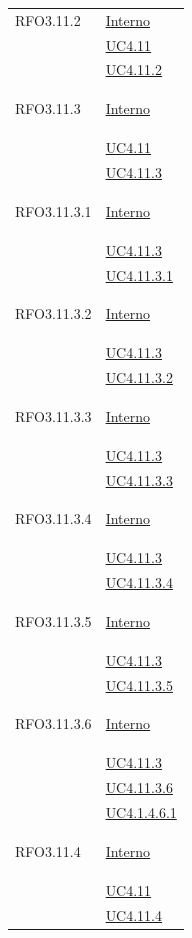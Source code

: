 \begin{longtable}{|>{\centering}m{5cm}|m{5cm}<{\centering}|}
\hypertarget{RFO3.11.2}{RFO3.11.2} & \hyperlink{Interno}{Interno}\\
& \hyperref[UC4.11]{UC4.11}\\
& \hyperref[UC4.11.2]{UC4.11.2}\\ \hline

\hypertarget{RFO3.11.3}{RFO3.11.3} & \hyperlink{Interno}{Interno}\\
& \hyperref[UC4.11]{UC4.11}\\
& \hyperref[UC4.11.3]{UC4.11.3}\\ \hline

\hypertarget{RFO3.11.3.1}{RFO3.11.3.1} & \hyperlink{Interno}{Interno}\\
& \hyperref[UC4.11.3]{UC4.11.3}\\
& \hyperref[UC4.11.3.1]{UC4.11.3.1}\\ \hline

\hypertarget{RFO3.11.3.2}{RFO3.11.3.2} & \hyperlink{Interno}{Interno}\\
& \hyperref[UC4.11.3]{UC4.11.3}\\
& \hyperref[UC4.11.3.2]{UC4.11.3.2}\\ \hline

\hypertarget{RFO3.11.3.3}{RFO3.11.3.3} & \hyperlink{Interno}{Interno}\\
& \hyperref[UC4.11.3]{UC4.11.3}\\
& \hyperref[UC4.11.3.3]{UC4.11.3.3}\\ \hline

\hypertarget{RFO3.11.3.4}{RFO3.11.3.4} & \hyperlink{Interno}{Interno}\\
& \hyperref[UC4.11.3]{UC4.11.3}\\
& \hyperref[UC4.11.3.4]{UC4.11.3.4}\\ \hline

\hypertarget{RFO3.11.3.5}{RFO3.11.3.5} & \hyperlink{Interno}{Interno}\\
& \hyperref[UC4.11.3]{UC4.11.3}\\
& \hyperref[UC4.11.3.5]{UC4.11.3.5}\\ \hline

\hypertarget{RFO3.11.3.6}{RFO3.11.3.6} & \hyperlink{Interno}{Interno}\\
& \hyperref[UC4.11.3]{UC4.11.3}\\
& \hyperref[UC4.11.3.6]{UC4.11.3.6}\\ 
& \hyperref[UC4.1.4.6.1]{UC4.1.4.6.1}\\ \hline

\hypertarget{RFO3.11.4}{RFO3.11.4} & \hyperlink{Interno}{Interno}\\
&\hyperref[UC4.11]{UC4.11}\\
&\hyperref[UC4.11.4]{UC4.11.4}\\ \hline


\end{longtable}
